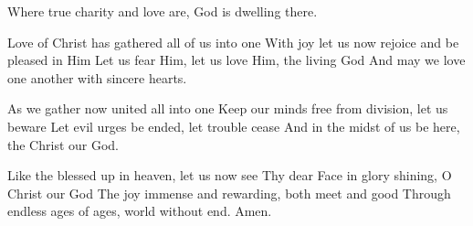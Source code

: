 
Where true charity and love are, God is dwelling there.

Love of Christ has gathered all of us into one
With joy let us now rejoice and be pleased in Him
Let us fear Him, let us love Him, the living God
And may we love one another with sincere hearts.

As we gather now united all into one
Keep our minds free from division, let us beware
Let evil urges be ended, let trouble cease
And in the midst of us be here, the Christ our God.

Like the blessed up in heaven, let us now see
Thy dear Face in glory shining, O Christ our God
The joy immense and rewarding, both meet and good
Through endless ages of ages, world without end.  Amen.


